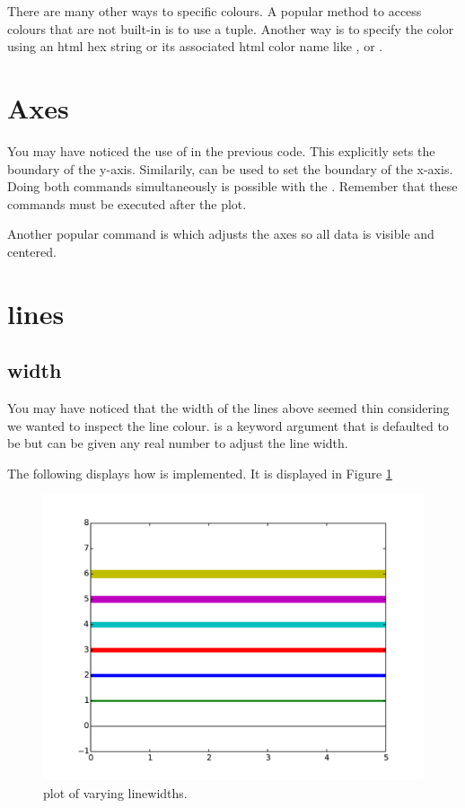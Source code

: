 There are many other ways to specific colours. 
A popular method to access colours that are not built-in is to use a  tuple. 
Another way is to specify the color using an html hex string or its associated html color name like , or . 

\section*{Axes}
You may have noticed the use of  in the previous code. 
This explicitly sets the boundary of the y-axis. Similarily,  can be used to set the boundary of the x-axis. 
Doing both commands simultaneously is possible with the . 
Remember that these commands must be executed after the plot. 

Another popular command is  which adjusts the axes so all data is visible and centered. 

\section*{lines}
\subsection*{width}
You may have noticed that the width of the lines above seemed thin considering we wanted to inspect the line colour. 
 is a keyword argument that is defaulted to be  but can be given any real number to adjust the line width. 

The following displays how  is implemented. It is displayed in Figure \ref{linewidth}


\begin{figure} 
\includegraphics[width=\textwidth]{linewidth.pdf}
\caption{plot of varying linewidths.}
\label{linewidth} 
\end{figure}


